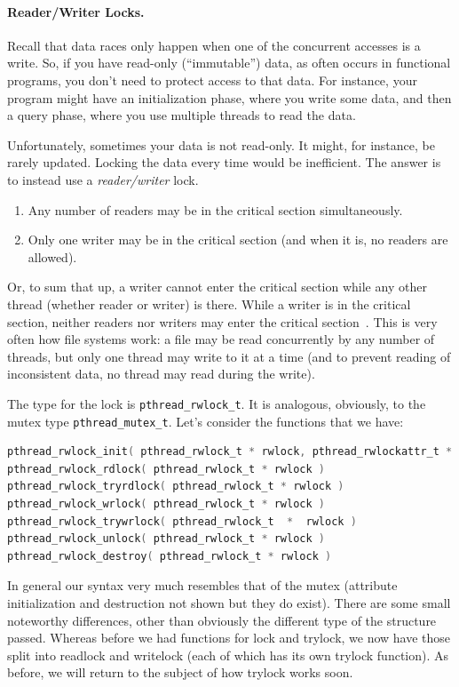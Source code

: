 \documentclass[a4paper]{report}
\begin{document}
\paragraph{Reader/Writer Locks.} Recall that data races only happen when
one of the concurrent accesses is a write. So, if you have read-only
(``immutable'') data, as often occurs in functional programs, you don't need
to protect access to that data. For instance, your program might
have an initialization phase, where you write some data, and then a 
query phase, where you use multiple threads to read the data.

Unfortunately, sometimes your data is not read-only. It might, for instance,
be rarely updated. Locking the data every time would be inefficient.
The answer is to instead use a \emph{reader/writer} lock.

\begin{enumerate}
\item Any number of readers may be in the critical section simultaneously.
\item Only one writer may be in the critical section (and when it is, no readers are allowed).
\end{enumerate}

Or, to sum that up, a writer cannot enter the critical section while any other thread (whether reader or writer) is there. While a writer is in the critical section, neither readers nor writers may enter the critical section~\cite{lbs}. This is very often how file systems work: a file may be read concurrently by any number of threads, but only one thread may write to it at a time (and to prevent reading of inconsistent data, no thread may read during the write).


The type for the lock is \texttt{pthread\_rwlock\_t}. It is analogous, obviously, to the mutex type \texttt{pthread\_mutex\_t}. Let's consider the functions that we have:

\begin{lstlisting}[language=C]
pthread_rwlock_init( pthread_rwlock_t * rwlock, pthread_rwlockattr_t * attr )
pthread_rwlock_rdlock( pthread_rwlock_t * rwlock )
pthread_rwlock_tryrdlock( pthread_rwlock_t * rwlock )
pthread_rwlock_wrlock( pthread_rwlock_t * rwlock )
pthread_rwlock_trywrlock( pthread_rwlock_t  *  rwlock )
pthread_rwlock_unlock( pthread_rwlock_t * rwlock )
pthread_rwlock_destroy( pthread_rwlock_t * rwlock )
\end{lstlisting}

In general our syntax very much resembles that of the mutex (attribute initialization and destruction not shown but they do exist). There are some small noteworthy differences, other than obviously the different type of the structure passed. Whereas before we had functions for lock and trylock, we now have those split into readlock and writelock (each of which has its own trylock function). As before, we will return to the subject of how trylock works soon.
\end{document}
